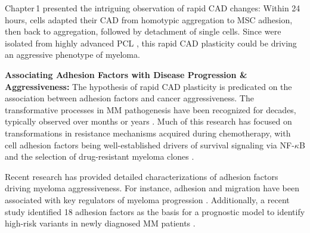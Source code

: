 \unnsubsection{\cadplasticitytitle}%
\label{sec:discussion_caddadaptability}%
Chapter\,1 presented the intriguing observation of rapid \ac{CAD} changes:
Within 24 hours, \INA cells adapted their \ac{CAD} from homotypic aggregation to
\ac{MSC} adhesion, then back to aggregation, followed by detachment of single
cells. Since \INA were isolated from highly advanced \ac{PCL}
\cite{burgerGp130RasMediated2001}, this rapid \ac{CAD} plasticity could be
driving an aggressive phenotype of myeloma.



\textbf{Associating Adhesion Factors with Disease Progression \& Aggressiveness:}
The hypothesis of rapid \ac{CAD} plasticity is predicated on the association
between adhesion factors and cancer aggressiveness. The transformative processes
in MM pathogenesis have been recognized for decades, typically observed over
months or years \cite{hallekMultipleMyelomaIncreasing1998}. Much of this
research has focused on transformations in resistance mechanisms acquired during
chemotherapy, with cell adhesion factors being well-established drivers of
survival signaling via NF-$\kappa$B and the selection of drug-resistant myeloma
clones \cite{landowskiCellAdhesionmediatedDrug2003,
      solimandoDrugResistanceMultiple2022}.


Recent research has provided detailed characterizations of adhesion factors
driving myeloma aggressiveness. For instance, adhesion and migration have been
associated with key regulators of myeloma progression%
%
\cite{shenProgressionSignatureUnderlies2021}.%
Additionally, a recent study identified 18 adhesion factors as the basis for a
prognostic model to identify high-risk variants in newly diagnosed MM patients
\cite{huDevelopmentCellAdhesionbased2024}.

